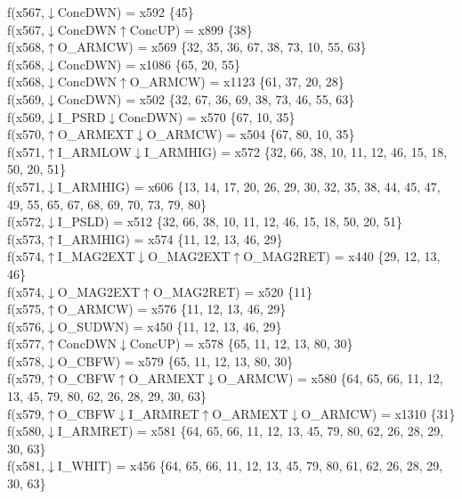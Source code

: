 f(x567,$\downarrow$ConcDWN) = x592 \{45\} \\  
f(x567,$\downarrow$ConcDWN$\uparrow$ConcUP) = x899 \{38\} \\  
f(x568,$\uparrow$O\_ARMCW) = x569 \{32, 35, 36, 67, 38, 73, 10, 55, 63\} \\  
f(x568,$\downarrow$ConcDWN) = x1086 \{65, 20, 55\} \\  
f(x568,$\downarrow$ConcDWN$\uparrow$O\_ARMCW) = x1123 \{61, 37, 20, 28\} \\  
f(x569,$\downarrow$ConcDWN) = x502 \{32, 67, 36, 69, 38, 73, 46, 55, 63\} \\  
f(x569,$\downarrow$I\_PSRD$\downarrow$ConcDWN) = x570 \{67, 10, 35\} \\  
f(x570,$\uparrow$O\_ARMEXT$\downarrow$O\_ARMCW) = x504 \{67, 80, 10, 35\} \\  
f(x571,$\uparrow$I\_ARMLOW$\downarrow$I\_ARMHIG) = x572 \{32, 66, 38, 10, 11, 12, 46, 15, 18, 50, 20, 51\} \\  
f(x571,$\downarrow$I\_ARMHIG) = x606 \{13, 14, 17, 20, 26, 29, 30, 32, 35, 38, 44, 45, 47, 49, 55, 65, 67, 68, 69, 70, 73, 79, 80\} \\  
f(x572,$\downarrow$I\_PSLD) = x512 \{32, 66, 38, 10, 11, 12, 46, 15, 18, 50, 20, 51\} \\  
f(x573,$\uparrow$I\_ARMHIG) = x574 \{11, 12, 13, 46, 29\} \\  
f(x574,$\uparrow$I\_MAG2EXT$\downarrow$O\_MAG2EXT$\uparrow$O\_MAG2RET) = x440 \{29, 12, 13, 46\} \\  
f(x574,$\downarrow$O\_MAG2EXT$\uparrow$O\_MAG2RET) = x520 \{11\} \\  
f(x575,$\uparrow$O\_ARMCW) = x576 \{11, 12, 13, 46, 29\} \\  
f(x576,$\downarrow$O\_SUDWN) = x450 \{11, 12, 13, 46, 29\} \\  
f(x577,$\uparrow$ConcDWN$\downarrow$ConcUP) = x578 \{65, 11, 12, 13, 80, 30\} \\  
f(x578,$\downarrow$O\_CBFW) = x579 \{65, 11, 12, 13, 80, 30\} \\  
f(x579,$\uparrow$O\_CBFW$\uparrow$O\_ARMEXT$\downarrow$O\_ARMCW) = x580 \{64, 65, 66, 11, 12, 13, 45, 79, 80, 62, 26, 28, 29, 30, 63\} \\  
f(x579,$\uparrow$O\_CBFW$\downarrow$I\_ARMRET$\uparrow$O\_ARMEXT$\downarrow$O\_ARMCW) = x1310 \{31\} \\  
f(x580,$\downarrow$I\_ARMRET) = x581 \{64, 65, 66, 11, 12, 13, 45, 79, 80, 62, 26, 28, 29, 30, 63\} \\  
f(x581,$\downarrow$I\_WHIT) = x456 \{64, 65, 66, 11, 12, 13, 45, 79, 80, 61, 62, 26, 28, 29, 30, 63\} \\  
